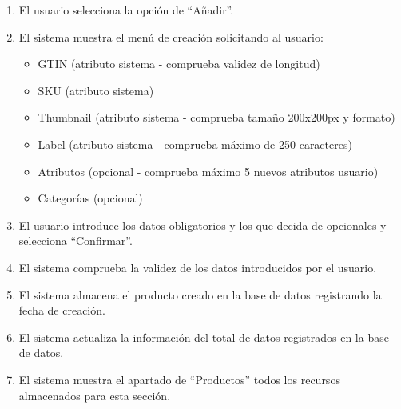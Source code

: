 \begin{enumerate}
    \item El usuario selecciona la opción de “Añadir”.
    \item El sistema muestra el menú de creación solicitando al usuario:
    \begin{itemize}
        \item GTIN (atributo sistema - comprueba validez de longitud)
        \item SKU (atributo sistema)
        \item Thumbnail (atributo sistema - comprueba tamaño 200x200px y formato)
        \item Label (atributo sistema - comprueba máximo de 250 caracteres)
        \item Atributos (opcional - comprueba máximo 5 nuevos atributos usuario)
        \item Categorías (opcional)
    \end{itemize}
    \item El usuario introduce los datos obligatorios y los que decida de opcionales y selecciona “Confirmar”.
    \item El sistema comprueba la validez de los datos introducidos por el usuario.
    \item El sistema almacena el producto creado en la base de datos registrando la fecha de creación.
    \item El sistema actualiza la información del total de datos registrados en la base de datos.
    \item El sistema muestra el apartado de “Productos” todos los recursos almacenados para esta sección.
\end{enumerate}

